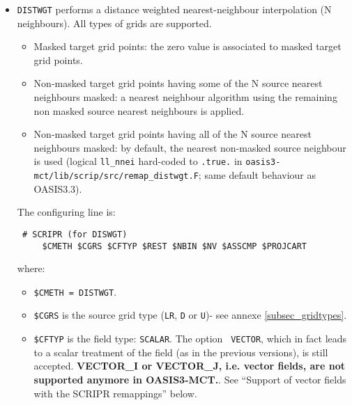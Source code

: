 \begin{itemize}
\begin{itemize}
  \item {\tt DISTWGT} performs a distance weighted nearest-neighbour
    interpolation (N neighbours). All types of grids are supported. 

     \begin{itemize}

     \item Masked target grid points: the zero value is associated to
       masked target grid points.

     \item Non-masked target grid points having some of the N source
       nearest neighbours masked: a nearest neighbour algorithm using
       the remaining non masked source nearest neighbours is applied.

     \item Non-masked target grid points having all of the N source
       nearest neighbours masked: by default, the nearest non-masked
       source neighbour is used (logical {\tt ll\_nnei} hard-coded to
       {\tt .true.} in {\tt oasis3-mct/lib/scrip/src/remap\_distwgt.F};
       same default behaviour as OASIS3.3). 

     \end{itemize}

  The configuring line is:

  \begin{verbatim}
 # SCRIPR (for DISWGT) 
     $CMETH $CGRS $CFTYP $REST $NBIN $NV $ASSCMP $PROJCART
  \end{verbatim} where:
\vspace{-0.5cm} 
  \begin{itemize} 
  \item {\tt \$CMETH = DISTWGT}. 
  \item {\tt \$CGRS} is the source grid
  type ({\tt LR}, {\tt D} or {\tt U})- see annexe
  \ref{subsec_gridtypes}. 

  \item {\tt \$CFTYP} is the field type: {\tt SCALAR}. The option {\tt
    VECTOR}, which in fact leads to a scalar treatment of the field
    (as in the previous versions), is still accepted. {\bf
      VECTOR\_I or VECTOR\_J, i.e. vector fields, are not
    supported anymore in OASIS3-MCT.}. See ``Support of vector fields
    with the SCRIPR remappings'' below.


\end{itemize}
\end{itemize}
\end{itemize}
